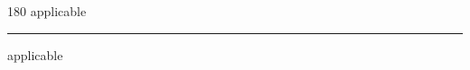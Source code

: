 
\begin{frame}
\begin{center}
\begin{turn}{180}
{\fontsize{2.5cm}{1em}\selectfont applicable}
\end{turn}
\vspace{1em}\par  
\hrule
\vspace{1em}\par  
{\fontsize{2.5cm}{1em}\selectfont applicable}
\end{center}
\end{frame}
